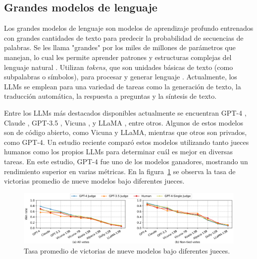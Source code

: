 \subsection{Grandes modelos de lenguaje}

Los grandes modelos de lenguaje son modelos de aprendizaje profundo entrenados con grandes cantidades de texto para predecir la probabilidad de secuencias de palabras. Se les llama "grandes" por los miles de millones de parámetros que manejan, lo cual les permite aprender patrones y estructuras complejas del lenguaje natural \cite{Vaswani2017}. Utilizan \textit{tokens}, que son unidades básicas de texto (como subpalabras o símbolos), para procesar y generar lenguaje \cite{Vaswani2017}. Actualmente, los LLMs se emplean para una variedad de tareas como la generación de texto, la traducción automática, la respuesta a preguntas y la síntesis de texto.

Entre los LLMs más destacados disponibles actualmente se encuentran GPT-4 \cite{OpenAIGPT4}, Claude \cite{AnthropicClaude}, GPT-3.5 \cite{OpenAIGPT35}, Vicuna \cite{LMSYSVicuna}, y LLaMA \cite{MetaLLaMA}, entre otros. Algunos de estos modelos son de código abierto, como Vicuna y LLaMA, mientras que otros son privados, como GPT-4. Un estudio reciente \cite{zheng2023judging} comparó estos modelos utilizando tanto jueces humanos como los propios LLMs para determinar cuál es mejor en diversas tareas. En este estudio, GPT-4 fue uno de los modelos ganadores, mostrando un rendimiento superior en varias métricas. En la figura~\ref{fig:comparacionLLMS} se observa la tasa de victorias promedio de nueve modelos bajo diferentes jueces.

\begin{figure}[h]
  \centering
  \includegraphics[width=\linewidth]{./Figures/comparacion_LLMs.png}
  \caption{Tasa promedio de victorias de nueve modelos bajo diferentes jueces\protect\footnotemark.}
  \label{fig:comparacionLLMS}
\end{figure}


